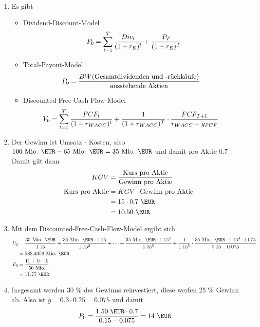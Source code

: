 \documentclass{article}
\begin{document}
	\begin{enumerate}[label=(\alph*)]
		\item Es gibt
		\begin{itemize}
			\item Dividend-Discount-Model
			\begin{align}
				P_0 = \sum_{t=1}^T \frac{Div_t}{(1+r_E)^t} + \frac{P_T}{(1+r_E)^T} \notag
			\end{align}
			\item Total-Payout-Model
			\begin{align}
				P_0 &= \frac{BW(\text{Gesamtdividenden und -rückkäufe})}{\text{ausstehende Aktien}} \notag
			\end{align}
			\item Discounted-Free-Cash-Flow-Model
			\begin{align}
				V_0 &= \sum_{t=1}^T \frac{FCF_t}{(1+r_{WACC})^t} + \frac{1}{(1+r_{WACC})^T}\cdot\frac{FCF_{T+1}}{r_{WACC} - g_{FCF}} \notag
			\end{align}
		\end{itemize}
		\item Der Gewinn ist Umsatz - Kosten, also $100 \text{ Mio. \EUR} - 65\text{ Mio. \EUR} = 35 \text{ Mio. \EUR}$ und damit pro Aktie 0.7 \EUR. Damit gilt dann
		\begin{align}
			KGV &= \frac{\text{Kurs pro Aktie}}{\text{Gewinn pro Aktie}} \notag \\
			\text{Kurs pro Aktie} &= KGV \cdot \text{Gewinn pro Aktie} \notag \\
			&= 15 \cdot 0.7 \text{ \EUR} \notag \\
			&= 10.50 \text{ \EUR} \notag
		\end{align}
		\item Mit dem Discounted-Free-Cash-Flow-Model ergibt sich
		\begin{align}
			V_0 &= \frac{35\text{ Mio. \EUR}}{1.15} + \frac{35\text{ Mio. \EUR}\cdot 1.15}{1.15^2} + \dots + \frac{35\text{ Mio. \EUR}\cdot 1.15^4}{1.15^5} + \frac{1}{1.15^5}\cdot\frac{35\text{ Mio. \EUR}\cdot 1.15^4\cdot 1.075}{0.15 - 0.075} \notag \\
			&= 588.4058 \text{ Mio. \EUR} \notag \\
			P_0 &= \frac{V_0 + 0 - 0}{50\text{ Mio.}} \notag \\
			&= 11.77 \text{ \EUR} \notag
		\end{align}
		\item Insgesamt werden 30 \% des Gewinns reinvestiert, diese werfen 25 \% Gewinn ab. Also ist $g=0.3\cdot 0.25 = 0.075$ und damit
		\begin{align}
			P_0 &= \frac{1.50\text{ \EUR}\cdot 0.7}{0.15 - 0.075} = 14 \text{ \EUR} \notag
		\end{align}
	\end{enumerate}
	
\end{document}
